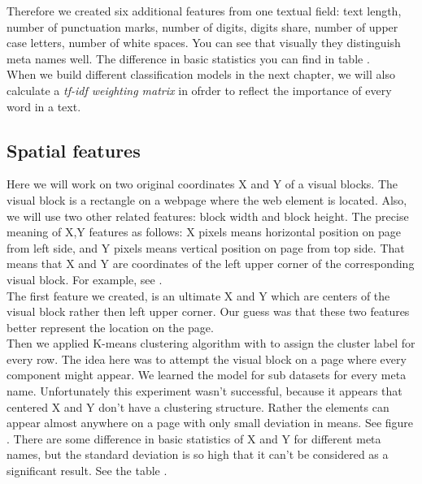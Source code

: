 Therefore we created six additional features from one textual field: text length, number of punctuation marks, number of digits, digits share, number of upper case letters, number of white spaces. You can see that visually they distinguish meta names well. The difference in basic statistics you can find in table . \\

When we build different classification models in the next chapter, we will also calculate a \textit{tf-idf weighting matrix} in ofrder to reflect the importance of every word in a text.

\subsection{Spatial features}

Here we will work on two original coordinates X and Y of a visual blocks. The visual block is a rectangle on a webpage where the web element is located. Also, we will use two other related features: block width and block height. The precise meaning of X,Y features as follows: X pixels means horizontal position on page from left side, and Y pixels means vertical position on page from top side. That means that X and Y are coordinates of the left upper corner of the corresponding visual block. For example, see .\\

The first feature we created, is an ultimate X and Y which are centers of the visual block rather then left upper corner. Our guess was that these two features better represent the location on the page.\\

Then we applied K-means clustering algorithm with to assign the cluster label for every row. The idea here was to attempt the visual block on a page where every component might appear. We learned the model for sub datasets for every meta name. Unfortunately this experiment wasn't successful, because it appears that centered X and Y don't have a clustering structure. Rather the elements can appear almost anywhere on a page with only small deviation in means. See figure . There are some difference in basic statistics of X and Y for different meta names, but the standard deviation is so high that it can't be considered as a significant result. See the table . \\

